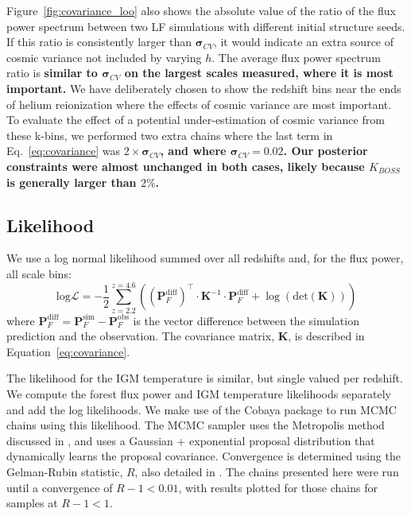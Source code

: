 Figure~\ref{fig:covariance_loo} also shows the absolute value of the ratio of the flux power spectrum between two LF simulations with different initial structure seeds. If this ratio is consistently larger than $\boldsymbol{\sigma}_{CV}$, it would indicate an extra source of cosmic variance not included by varying $h$. The average flux power spectrum ratio is \textbf{similar to $\boldsymbol{\sigma}_{CV}$ on the largest scales measured, where it is most important.} We have deliberately chosen to show the redshift bins near the ends of helium reionization where the effects of cosmic variance are most important. To evaluate the effect of a potential under-estimation of cosmic variance from these k-bins, we performed two extra chains where the last term in Eq.~\ref{eq:covariance} was $2\times \boldsymbol{\sigma}_{CV}$\textbf{, and where $\boldsymbol{\sigma}_{CV} = 0.02$. Our posterior constraints were almost unchanged in both cases, likely because $K_{BOSS}$ is generally larger than $2\%$.}

\subsection{Likelihood}\label{sec:likelihood}

We use a log normal likelihood summed over all redshifts and, for the flux power, all scale bins:
\begin{equation}
    \mathrm{log}\mathcal{L} = -\frac{1}{2} \sum_{z=2.2}^{z=4.6} \left(\left(\boldsymbol{P}_F^{\mathrm{diff}}\right)^\top \cdot \boldsymbol{K}^{-1} \cdot \boldsymbol{P}_F^{\mathrm{diff}} + \log\left( \mathrm{det}(\boldsymbol{K})\right)\right)
    \label{eq:likelihood}
\end{equation}
where $\boldsymbol{P}_F^{\mathrm{diff}} = \boldsymbol{P}_F^{\mathrm{sim}} - \boldsymbol{P}_F^{\mathrm{obs}}$ is the vector difference between the simulation prediction and the observation.
The covariance matrix, $\boldsymbol{K}$, is described in Equation~\ref{eq:covariance}. 

The likelihood for the IGM temperature is similar, but single valued per redshift.
We compute the \lya forest flux power and IGM temperature likelihoods separately and add the log likelihoods. We make use of the Cobaya package \cite{2021JCAP...05..057T, 2019ascl.soft10019T, 2013PhRvD..87j3529L, 2002PhRvD..66j3511L} to run MCMC chains using this likelihood.
The MCMC sampler uses the Metropolis method discussed in \cite{2013PhRvD..87j3529L}, and uses a Gaussian + exponential proposal distribution that dynamically learns the proposal covariance.
Convergence is determined using the Gelman-Rubin statistic, $R$, also detailed in \cite{2013PhRvD..87j3529L}.
The chains presented here were run until a convergence of $R-1 < 0.01$, with results plotted for those chains for samples at $R-1 < 1$.


